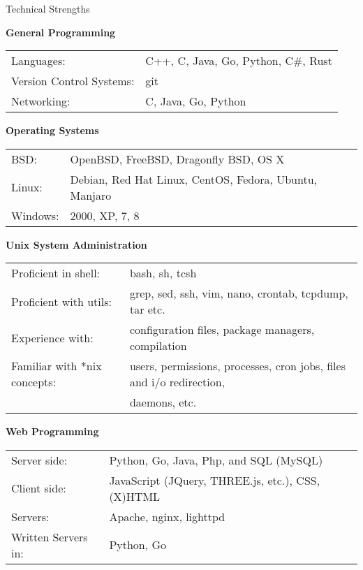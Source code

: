 \documentclass{resume} %
\newcommand{\btab}[2]{
	\bgroup
	\def\arraystretch{#1}
	\begin{tabular}{#2}
}
\newcommand{\etab}{
	\end{tabular} \smallskip
	\egroup
}
\begin{document}
\begin{rSection}{Technical Strengths}

{\bf General Programming}

\btab{1.1}{ l l }
	Languages: & C++, C, Java, Go, Python, C\#, Rust \\
	Version Control Systems: & git \\
	Networking: & C, Java, Go, Python \\
\etab

{\bf Operating Systems}

\btab{1.1}{ l l }
	BSD: & OpenBSD, FreeBSD, Dragonfly BSD, OS X \\
	Linux: & Debian, Red Hat Linux, CentOS, Fedora, Ubuntu, Manjaro \\
	Windows: & 2000, XP, 7, 8
\etab

{\bf Unix System Administration}

\btab{1.1}{ l l }
	Proficient in shell: & bash, sh, tcsh \\
	Proficient with utils: & grep, sed, ssh, vim, nano, crontab, tcpdump, tar etc. \\
	Experience with: & configuration files, package managers, compilation \\
	Familiar with *nix concepts: & users, permissions, processes, cron jobs, files and i/o redirection, \\
	& daemons, etc.
\etab

{\bf Web Programming}

\btab{1.1}{ l l }
	Server side: & Python, Go, Java, Php, and SQL (MySQL) \\
	Client side: & JavaScript (JQuery, THREE.js, etc.), CSS, (X)HTML \\
	Servers: & Apache, nginx, lighttpd \\
	Written Servers in: & Python, Go \\
\etab

\end{rSection}
\end{document}
